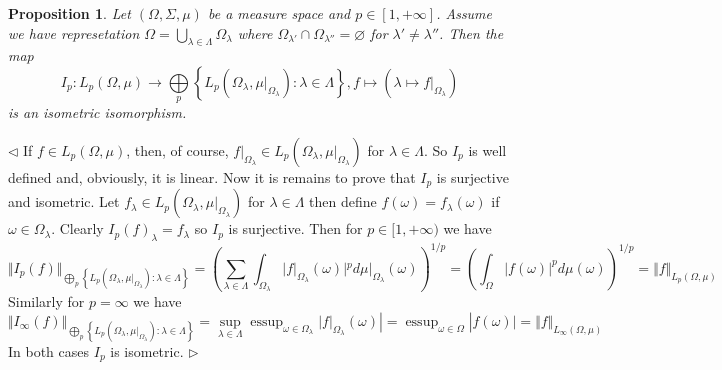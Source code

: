 \documentclass[12pt]{article}
\newtheorem{proposition}[theorem]{Proposition}
\newenvironment{proof}{\par $\triangleleft$}{$\triangleright$}
\begin{document}
\begin{proposition}\label{LpSpDecomp} Let $(\Omega,\Sigma,\mu)$ be a measure space and $p\in[1,+\infty]$. Assume we have represetation $\Omega=\bigcup_{\lambda\in\Lambda}\Omega_\lambda$ where $\Omega_{\lambda'}\cap\Omega_{\lambda''}=\varnothing$ for $\lambda'\neq\lambda''$. Then the map
$$
I_p:L_p(\Omega,\mu)\to \bigoplus\limits_p \left\{L_p(\Omega_\lambda,\mu|_{\Omega_\lambda}):\lambda\in\Lambda\right\}, f\mapsto (\lambda\mapsto f|_{\Omega_\lambda})
$$
is an isometric isomorphism.
\end{proposition}
\begin{proof}
If $f\in L_p(\Omega,\mu)$, then, of course, $f|_{\Omega_\lambda}\in L_p(\Omega_\lambda,\mu|_{\Omega_\lambda})$ for $\lambda\in\Lambda$. So $I_p$ is well defined and, obviously, it is linear. Now it is remains to prove that $I_p$ is surjective and isometric. Let $f_\lambda\in L_p(\Omega_\lambda,\mu|_{\Omega_\lambda})$ for $\lambda\in\Lambda$ then define $f(\omega)=f_\lambda(\omega)$ if $\omega\in \Omega_\lambda$. Clearly $I_p(f)_\lambda=f_\lambda$ so $I_p$ is surjective. Then for $p\in[1,+\infty)$ we have
$$
\Vert I_p(f)\Vert_{\bigoplus\limits_p \left\{L_p(\Omega_\lambda,\mu|_{\Omega_\lambda}):\lambda\in\Lambda\right\}}
=\left(\sum\limits_{\lambda\in\Lambda}\int_{\Omega_\lambda}|f|_{\Omega_\lambda}(\omega)|^p d\mu|_{\Omega_\lambda}(\omega)\right)^{1/p}
=\left(\int_{\Omega}|f(\omega)|^pd\mu(\omega)\right)^{1/p}
=\Vert f\Vert_{L_p(\Omega,\mu)}
$$
Similarly for $p=\infty$ we have
$$
\Vert I_\infty(f)\Vert_{\bigoplus\limits_p \left\{L_p(\Omega_\lambda,\mu|_{\Omega_\lambda}):\lambda\in\Lambda\right\}}
=\sup\limits_{\lambda\in\Lambda}\mathop{\operatorname{essup}}_{\omega\in\Omega_\lambda}|f|_{\Omega_\lambda}(\omega)|
=\mathop{\operatorname{essup}}_{\omega\in\Omega}|f(\omega)|
=\Vert f\Vert_{L_\infty(\Omega,\mu)}
$$
In both cases $I_p$ is isometric.
\end{proof}
\end{document}
